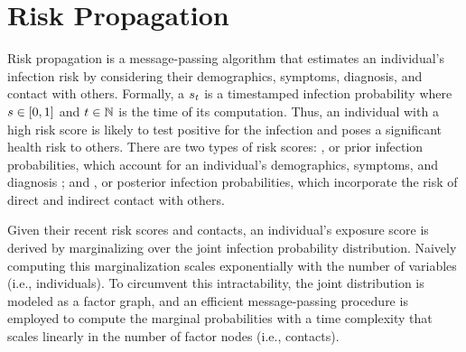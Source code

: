 \chapter{Risk Propagation}\label{ch:risk-propagation}

\newcommand{\eventSpace}{\Omega}
\newcommand{\event}{\omega}

Risk propagation is a message-passing algorithm that estimates an individual's infection risk by considering their demographics, symptoms, diagnosis, and contact with others. Formally, a  $s_t$ is a timestamped infection probability where $s \in [0, 1]$ and $t \in \mathbb{N}$ is the time of its computation. Thus, an individual with a high risk score is likely to test positive for the infection and poses a significant health risk to others. There are two types of risk scores: , or prior infection probabilities, which account for an individual's demographics, symptoms, and diagnosis \citep{Menni2020}; and , or posterior infection probabilities, which incorporate the risk of direct and indirect contact with others.

Given their recent risk scores and contacts, an individual's exposure score is derived by marginalizing over the joint infection probability distribution. Naively computing this marginalization scales exponentially with the number of variables (i.e., individuals). To circumvent this intractability, the joint distribution is modeled as a factor graph, and an efficient message-passing procedure is employed to compute the marginal probabilities with a time complexity that scales linearly in the number of factor nodes (i.e., contacts).

